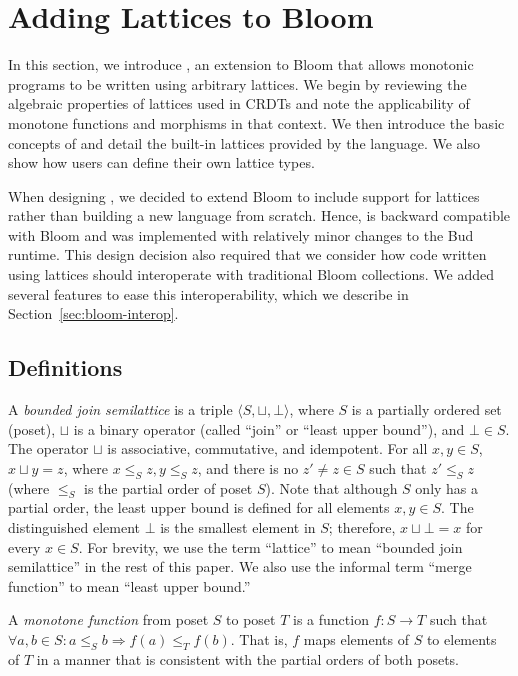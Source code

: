 \section{Adding Lattices to Bloom}
\label{sec:lang}

In this section, we introduce \lang, an extension to Bloom that allows monotonic
programs to be written using arbitrary lattices. We begin by reviewing the
algebraic properties of lattices used in CRDTs and note the applicability of
monotone functions and morphisms in that context. We then introduce the basic
concepts of \lang and detail the built-in lattices provided by the language. We
also show how users can define their own lattice types.

When designing \lang, we decided to extend Bloom to include support for lattices
rather than building a new language from scratch. Hence, \lang is backward
compatible with Bloom and was implemented with relatively minor changes to the
Bud runtime. This design decision also required that we consider how code
written using lattices should interoperate with traditional Bloom collections. We
added several \lang features to ease this interoperability, which we describe in
Section~\ref{sec:bloom-interop}.

\subsection{Definitions}
\label{sec:lattice-defn}
A \emph{bounded join semilattice} is a triple $\langle S, \sqcup, \bot\rangle$,
where $S$ is a partially ordered set (poset), $\sqcup$ is a binary operator
(called ``join'' or ``least upper bound''), and $\bot \in S$. The operator
$\sqcup$ is associative, commutative, and idempotent. For all $x, y \in S$, $x
\sqcup y = z$, where $x \leq_S z, y \leq_S z$, and there is no $z' \ne z \in S$
such that $z' \leq_S z$ (where $\leq_S$ is the partial order of poset $S$). Note
that although $S$ only has a partial order, the least upper bound is defined for
all elements $x,y \in S$. The distinguished element $\bot$ is the smallest
element in $S$; therefore, $x \sqcup \bot = x$ for every $x \in S$. For brevity,
we use the term ``lattice'' to mean ``bounded join semilattice'' in the rest of
this paper. We also use the informal term ``merge function'' to mean ``least
upper bound.''

A \emph{monotone function} from poset $S$ to poset $T$ is a function $f: S \to
T$ such that $\forall a,b \in S: a \leq_S b \Rightarrow f(a) \leq_T f(b)$. That
is, $f$ maps elements of $S$ to elements of $T$ in a manner that is consistent
with the partial orders of both posets.

